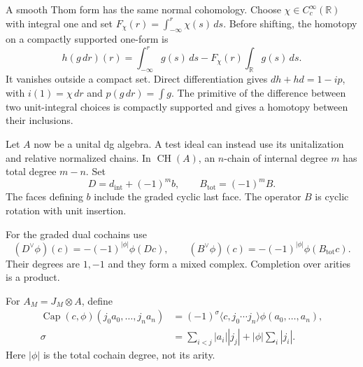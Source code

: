 A smooth Thom form has the same normal cohomology. Choose
$\chi\in C_c^\infty(\mathbb R)$ with integral one and set
$F_\chi(r)=\int_{-\infty}^r\chi(s)\,ds$.
Before shifting, the homotopy on a compactly supported one-form is
\[
 h(g\,dr)(r)=\int_{-\infty}^r g(s)\,ds
                       -F_\chi(r)\int_{\mathbb R}g(s)\,ds.
\]
It vanishes outside a compact set. Direct differentiation
gives $dh+hd=1-ip$, with $i(1)=\chi\,dr$ and
$p(g\,dr)=\int g$. The primitive of the difference between
two unit-integral choices is compactly supported and gives
a homotopy between their inclusions.

Let $A$ now be a unital dg algebra. A test ideal can instead
use its unitalization and relative normalized chains.
In $\operatorname{CH}(A)$, an $n$-chain of internal degree
$m$ has total degree $m-n$. Set
\[
 D=d_{\mathrm{int}}+(-1)^m b,\qquad
 B_{\mathrm{tot}}=(-1)^m B.
\]
The faces defining $b$ include the graded cyclic last face.
The operator $B$ is cyclic rotation with unit insertion.

For the graded dual cochains use
\[
 (D^\vee\phi)(c)=-(-1)^{|\phi|}\phi(Dc),\qquad
 (B^\vee\phi)(c)=-(-1)^{|\phi|}\phi(B_{\mathrm{tot}}c).
\]
Their degrees are $1,-1$ and they form a mixed complex.
Completion over arities is a product.

For $A_M=J_M\otimes A$, define
\begin{equation}\label{mht:eq:normal-cap}
 \begin{split}
 \operatorname{Cap}(c,\phi)(j_0a_0,\ldots,j_na_n)
  &={}(-1)^\sigma
      \langle c,j_0\cdots j_n\rangle\phi(a_0,\ldots,a_n),\\
 \sigma&=\sum_{i<j}|a_i||j_j|+|\phi|\sum_i|j_i|.
 \end{split}
\end{equation}
Here $|\phi|$ is the total cochain degree, not its arity.

